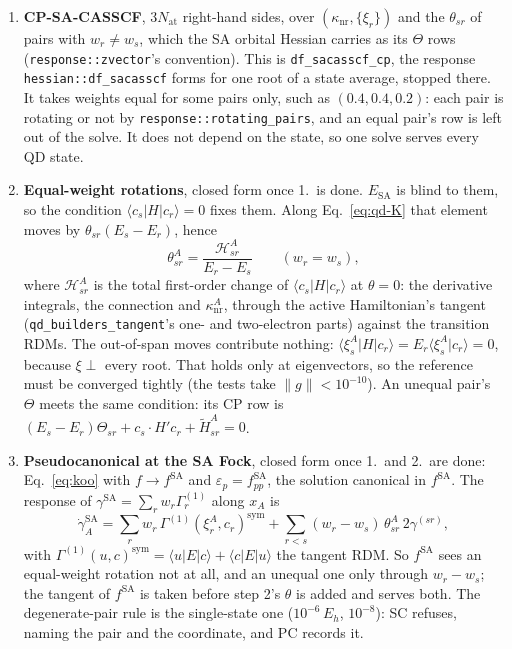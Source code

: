 \documentclass[11pt]{article}
\newcommand{\code}[1]{\texttt{#1}}
\newcommand{\G}[1]{\Gamma^{(#1)}}
\newcommand{\eps}{\varepsilon}
\begin{document}
\begin{enumerate}
\item \textbf{CP-SA-CASSCF}, $3N_{\mathrm{at}}$ right-hand sides, over
  $(\kappa_{\mathrm{nr}}, \{\xi_r\})$ and the $\theta_{sr}$ of pairs with
  $w_r \neq w_s$, which the SA orbital Hessian carries as its $\Theta$ rows
  (\code{response::zvector}'s convention). This is
  \code{df\_sacasscf\_cp}, the response \code{hessian::df\_sacasscf} forms
  for one root of a state average, stopped there. It takes weights equal
  for some pairs only, such as $(0.4, 0.4, 0.2)$: each pair is rotating or
  not by \code{response::rotating\_pairs}, and an equal pair's row is left
  out of the solve. It does not depend on the state, so one solve serves
  every QD state.
\item \textbf{Equal-weight rotations}, closed form once 1.\ is done.
  $E_{\mathrm{SA}}$ is blind to them, so the condition $\langle c_s|H|c_r\rangle
  = 0$ fixes them. Along Eq.~\eqref{eq:qd-K} that element moves by
  $\theta_{sr}(E_s - E_r)$, hence
  \begin{equation}
    \theta^A_{sr} = \frac{\mathcal H^A_{sr}}{E_r - E_s}\qquad(w_r = w_s),
    \label{eq:qd-theta}
  \end{equation}
  where $\mathcal H^A_{sr}$ is the total first-order change of $\langle
  c_s|H|c_r\rangle$ at $\theta = 0$: the derivative integrals, the
  connection and $\kappa^A_{\mathrm{nr}}$, through the active
  Hamiltonian's tangent (\code{qd\_builders\_tangent}'s one- and
  two-electron parts) against the transition RDMs. The out-of-span moves
  contribute nothing: $\langle\xi^A_s|H|c_r\rangle = E_r\langle
  \xi^A_s|c_r\rangle = 0$, because $\xi \perp$ every root. That holds only
  at eigenvectors, so the reference must be converged tightly (the tests
  take $\lVert g\rVert < 10^{-10}$). An unequal pair's $\Theta$ meets the
  same condition: its CP row is $(E_s - E_r)\Theta_{sr} + c_s\cdot H'c_r +
  \tilde H^A_{sr} = 0$.
\item \textbf{Pseudocanonical at the SA Fock}, closed form once 1.\ and 2.\
  are done: Eq.~\eqref{eq:koo} with $f \to f^{\mathrm{SA}}$ and $\eps_p =
  f^{\mathrm{SA}}_{pp}$, the solution canonical in $f^{\mathrm{SA}}$. The
  response of $\gamma^{\mathrm{SA}} = \sum_r w_r\G1_r$ along $x_A$ is
  \begin{equation}
    \dot\gamma^{\mathrm{SA}}_A = \sum_r w_r\,\G1(\xi^A_r, c_r)^{\mathrm{sym}}
      + \sum_{r<s}(w_r - w_s)\,\theta^A_{sr}\,2\gamma^{(sr)},
    \label{eq:qd-gsa}
  \end{equation}
  with $\G1(u, c)^{\mathrm{sym}} = \langle u|E|c\rangle + \langle c|E|u\rangle$
  the tangent RDM. So $f^{\mathrm{SA}}$ sees an equal-weight rotation not at
  all, and an unequal one only through $w_r - w_s$; the tangent of
  $f^{\mathrm{SA}}$ is taken before step 2's $\theta$ is added and serves
  both. The degenerate-pair rule is the single-state one ($10^{-6}\,E_h$,
  $10^{-8}$): SC refuses, naming the pair and the coordinate, and PC
  records it.
\end{enumerate}
\end{document}
